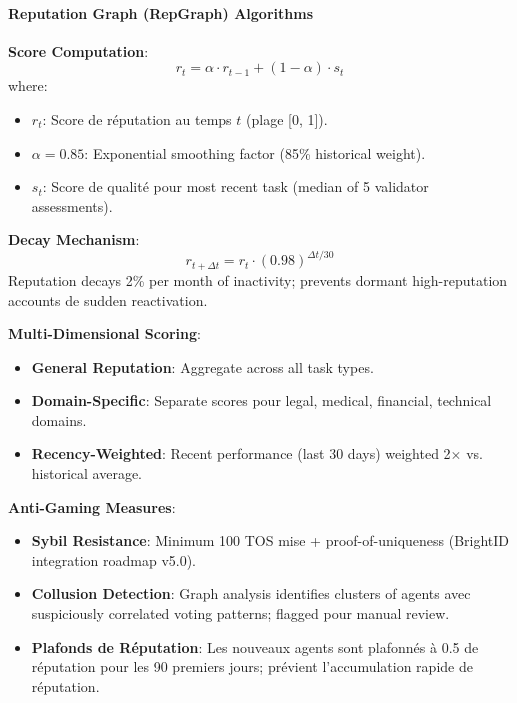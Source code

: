 \documentclass[11pt]{article}
\begin{document}
\paragraph{Reputation Graph (RepGraph) Algorithms}

\textbf{Score Computation}:
\begin{equation}
r_t = \alpha \cdot r_{t-1} + (1 - \alpha) \cdot s_t
\end{equation}
where:
\begin{itemize}[noitemsep]
  \item $r_t$: Score de réputation au temps $t$ (plage [0, 1]).
  \item $\alpha = 0.85$: Exponential smoothing factor (85\% historical weight).
  \item $s_t$: Score de qualité pour most recent task (median of 5 validator assessments).
\end{itemize}

\textbf{Decay Mechanism}:
\begin{equation}
r_{t+\Delta t} = r_t \cdot (0.98)^{\Delta t / 30}
\end{equation}
Reputation decays 2\% per month of inactivity; prevents dormant high-reputation accounts de sudden reactivation.

\textbf{Multi-Dimensional Scoring}:
\begin{itemize}[noitemsep]
  \item \textbf{General Reputation}: Aggregate across all task types.
  \item \textbf{Domain-Specific}: Separate scores pour legal, medical, financial, technical domains.
  \item \textbf{Recency-Weighted}: Recent performance (last 30 days) weighted 2$\times$ vs. historical average.
\end{itemize}

\textbf{Anti-Gaming Measures}:
\begin{itemize}[noitemsep]
  \item \textbf{Sybil Resistance}: Minimum 100 TOS mise + proof-of-uniqueness (BrightID integration roadmap v5.0).
  \item \textbf{Collusion Detection}: Graph analysis identifies clusters of agents avec suspiciously correlated voting patterns; flagged pour manual review.
  \item \textbf{Plafonds de Réputation}: Les nouveaux agents sont plafonnés à 0.5 de réputation pour les 90 premiers jours; prévient l'accumulation rapide de réputation.
\end{itemize}
\end{document}
